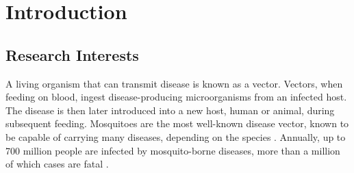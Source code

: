 \section{Introduction}
\label{sec:bg-intro}

    \subsection{Research Interests}
    \label{subsec:bg-intro-resinterests}
        A living organism that can transmit disease is known as a vector. Vectors, when feeding on blood, ingest disease-producing microorganisms from an infected host. The disease is then later introduced into a new host, human or animal, during subsequent feeding. 
        Mosquitoes are the most well-known disease vector, known to be capable of carrying many diseases, depending on the species \cite{WHOVectorBorneDisease2016}.
        Annually, up to 700 million people are infected by mosquito-borne diseases, more than a million of which cases are fatal \cite{Caraballo2014}.
        
